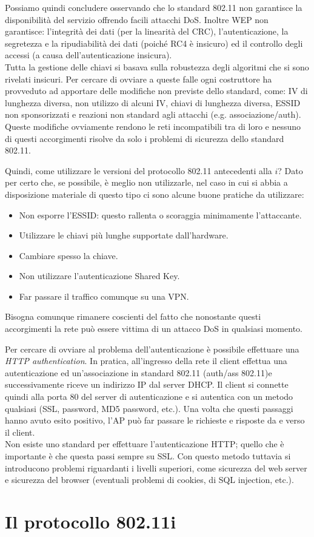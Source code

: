 Possiamo quindi concludere osservando che lo standard 802.11 non garantisce la disponibilità del servizio offrendo facili attacchi DoS. Inoltre WEP non garantisce: l'integrità dei dati (per la linearità del CRC), l'autenticazione, la segretezza e la ripudiabilità dei dati (poiché RC4 è insicuro) ed il controllo degli accessi (a causa dell'autenticazione insicura).\\
Tutta la gestione delle chiavi si basava sulla robustezza degli algoritmi che si sono rivelati insicuri. Per cercare di ovviare a queste falle ogni costruttore ha provveduto ad apportare delle modifiche non previste dello standard, come: IV di lunghezza diversa, non utilizzo di alcuni IV, chiavi di lunghezza diversa, ESSID non sponsorizzati e reazioni non standard agli attacchi (e.g. associazione/auth). Queste modifiche ovviamente rendono le reti incompatibili tra di loro e nessuno di questi accorgimenti risolve da solo i problemi di sicurezza dello standard 802.11.

Quindi, come utilizzare le versioni del protocollo 802.11 antecedenti alla $i$? Dato per certo che, se possibile, è meglio non utilizzarle, nel caso in cui si abbia a disposizione materiale di questo tipo ci sono alcune buone pratiche da utilizzare:
\begin{itemize}
	\item Non esporre l'ESSID: questo rallenta o scoraggia minimamente l'attaccante.
	\item Utilizzare le chiavi più lunghe supportate dall'hardware.
	\item Cambiare spesso la chiave.
	\item Non utilizzare l'autenticazione Shared Key.
	\item Far passare il traffico comunque su una VPN.
\end{itemize}
Bisogna comunque rimanere coscienti del fatto che nonostante questi accorgimenti la rete può essere vittima di un attacco DoS in qualsiasi momento.

Per cercare di ovviare al problema dell'autenticazione è possibile effettuare una \textit{HTTP authentication}. In pratica, all'ingresso della rete il client effettua una autenticazione ed un'associazione in standard 802.11 (auth/ass 802.11)e successivamente riceve un indirizzo IP dal server DHCP. Il client si connette quindi alla porta 80 del server di autenticazione e si autentica con un metodo qualsiasi (SSL, password, MD5 password, etc.). Una volta che questi passaggi hanno avuto esito positivo, l'AP può far passare le richieste e risposte da e verso il client.\\
Non esiste uno standard per effettuare l'autenticazione HTTP; quello che è importante è che questa passi sempre su SSL. Con questo metodo tuttavia si introducono problemi riguardanti i livelli superiori, come sicurezza del web server e sicurezza del browser (eventuali problemi di cookies, di SQL injection, etc.).

\section{Il protocollo 802.11i}